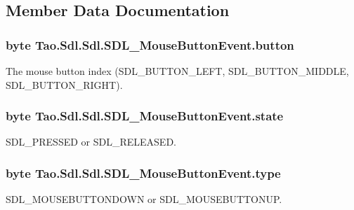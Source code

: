 \subsection{Member Data Documentation}
\hypertarget{struct_tao_1_1_sdl_1_1_sdl_1_1_s_d_l___mouse_button_event_ac38acdda954b63dea23005661b539f9f}{
\subsubsection[{button}]{\setlength{\rightskip}{0pt plus 5cm}byte {\bf Tao.Sdl.Sdl.SDL\_\-MouseButtonEvent.button}}}
\label{struct_tao_1_1_sdl_1_1_sdl_1_1_s_d_l___mouse_button_event_ac38acdda954b63dea23005661b539f9f}


The mouse button index (SDL\_\-BUTTON\_\-LEFT, SDL\_\-BUTTON\_\-MIDDLE, SDL\_\-BUTTON\_\-RIGHT). 

\hypertarget{struct_tao_1_1_sdl_1_1_sdl_1_1_s_d_l___mouse_button_event_ac9f8588a4e768fc2f973ce149456311a}{
\subsubsection[{state}]{\setlength{\rightskip}{0pt plus 5cm}byte {\bf Tao.Sdl.Sdl.SDL\_\-MouseButtonEvent.state}}}
\label{struct_tao_1_1_sdl_1_1_sdl_1_1_s_d_l___mouse_button_event_ac9f8588a4e768fc2f973ce149456311a}


SDL\_\-PRESSED or SDL\_\-RELEASED. 

\hypertarget{struct_tao_1_1_sdl_1_1_sdl_1_1_s_d_l___mouse_button_event_af73bc2825de969d231eec503be2d37e0}{
\subsubsection[{type}]{\setlength{\rightskip}{0pt plus 5cm}byte {\bf Tao.Sdl.Sdl.SDL\_\-MouseButtonEvent.type}}}
\label{struct_tao_1_1_sdl_1_1_sdl_1_1_s_d_l___mouse_button_event_af73bc2825de969d231eec503be2d37e0}


SDL\_\-MOUSEBUTTONDOWN or SDL\_\-MOUSEBUTTONUP. 

